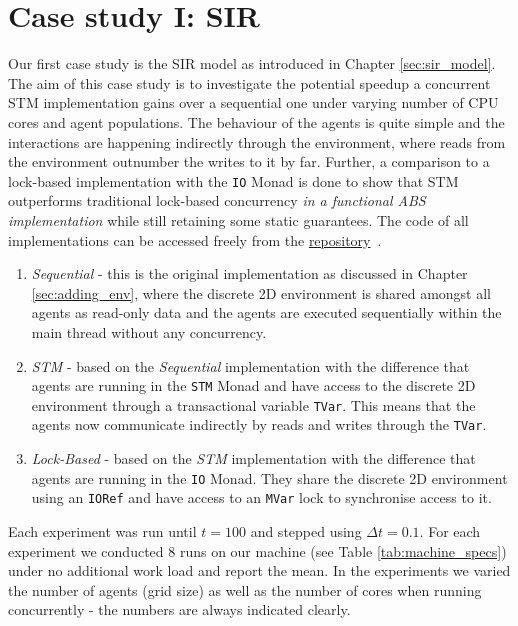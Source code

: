 \section{Case study I: SIR}
\label{sec:concurrent_sir}
Our first case study is the SIR model as introduced in Chapter \ref{sec:sir_model}. The aim of this case study is to investigate the potential speedup a concurrent STM implementation gains over a sequential one under varying number of CPU cores and agent populations. The behaviour of the agents is quite simple and the interactions are happening indirectly through the environment, where reads from the environment outnumber the writes to it by far. Further, a comparison to a lock-based implementation with the \texttt{IO} Monad is done to show that STM outperforms traditional lock-based concurrency \textit{in a functional ABS implementation} while still retaining some static guarantees. The code of all implementations can be accessed freely from the \href{https://github.com/thalerjonathan/haskell-stm-sir}{repository}~\cite{thaler_stm_sir_repository}.

\begin{enumerate}
	\item \textit{Sequential} - this is the original implementation as discussed in Chapter \ref{sec:adding_env}, where the discrete 2D environment is shared amongst all agents as read-only data and the agents are executed sequentially within the main thread without any concurrency.
	\item \textit{STM} - based on the \textit{Sequential} implementation with the difference that agents are running in the \texttt{STM} Monad and have access to the discrete 2D environment through a transactional variable \texttt{TVar}. This means that the agents now communicate indirectly by reads and writes through the \texttt{TVar}.
	\item \textit{Lock-Based} - based on the \textit{STM} implementation with the difference that agents are running in the \texttt{IO} Monad. They share the discrete 2D environment using an \texttt{IORef} and have access to an \texttt{MVar} lock to synchronise access to it.
\end{enumerate}

Each experiment was run until $t = 100$ and stepped using $\Delta t = 0.1$. For each experiment we conducted 8 runs on our machine (see Table \ref{tab:machine_specs}) under no additional work load and report the mean. %
In the experiments we varied the number of agents (grid size) as well as the number of cores when running concurrently - the numbers are always indicated clearly.

